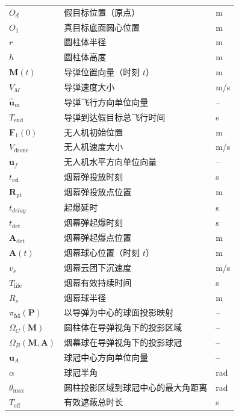 \documentclass{ctexart}
\begin{document}
\begin{longtable}{@{} p{2.8cm} p{6.5cm} p{1.8cm} @{}}
$O_d$          & 假目标位置（原点）                                 & m \\
$O_1$          & 真目标底面圆心位置                                     & m \\
$r$            & 圆柱体半径                                             & m \\
$h$            & 圆柱体高度                                             & m \\
$\mathbf{M}(t)$ & 导弹位置向量（时刻 $t$）                             & m \\
$V_M$          & 导弹速度大小                                           & m/s \\
$\hat{\mathbf{u}}_m$ & 导弹飞行方向单位向量                                   & -- \\
$T_{\text{end}}$ & 导弹到达假目标总飞行时间                             & s \\
$\mathbf{F}_1(0)$ & 无人机初始位置                                     & m \\
$V_{\text{drone}}$          & 无人机速度大小                                         & m/s \\
$\mathbf{u}_f$ & 无人机水平方向单位向量                                 & -- \\
$t_{\text{rel}}$ & 烟幕弹投放时刻                                     & s \\
$\mathbf{R}_\text{pt}$   & 烟幕弹投放点位置                                       & m \\
$t_{delay}$ & 起爆延时                                     & s \\
$t_{\text{det}}$ & 烟幕弹起爆时刻                                     & s \\
$\mathbf{A}_{\text{det}}$ & 烟幕弹起爆点位置                             & m \\
$\mathbf{A}(t)$ & 烟幕球心位置（时刻 $t$）                           & m \\
$v_s$          & 烟幕云团下沉速度                                       & m/s \\
$T_{\text{life}}$ & 烟幕有效持续时间                                   & s \\
$R_s$          & 烟幕球半径                                             & m \\
$\pi_{\mathbf{M}}(\mathbf{P})$ & 以导弹为中心的球面投影映射                   & -- \\
$\Omega_C(\mathbf{M})$ & 圆柱体在导弹视角下的投影区域     & -- \\
$\Omega_B(\mathbf{M},\mathbf{A})$ & 烟幕球在导弹视角下的投影球冠               & -- \\
$\mathbf{u}_A$ & 球冠中心方向单位向量                                   & -- \\
$\alpha$       & 球冠半角                              & rad \\
$\theta_{\max}$ & 圆柱投影区域到球冠中心的最大角距离                  & rad \\
$T_{\text{eff}}$ & 有效遮蔽总时长                                     & s


\end{longtable}
\end{document}
